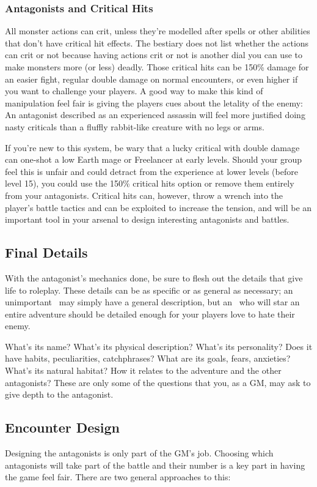 \begin{multicols}{2}
\subsubsection{Antagonists and Critical Hits}\label{gm-enemycrit}
All monster actions can crit, unless they're modelled after spells or other abilities that don't have critical hit effects. The bestiary does not list whether the actions can crit or not because having actions crit or not is another dial you can use to make monsters more (or less) deadly. Those critical hits can be 150\% damage for an easier fight, regular double damage on normal encounters, or even higher if you want to challenge your players. A good way to make this kind of manipulation feel fair is giving the players cues about the letality of the enemy: An antagonist described as an experienced assassin will feel more justified doing nasty criticals than a fluffly rabbit-like creature with no legs or arms.

If you're new to this system, be wary that a lucky critical with double damage can one-shot a low Earth mage or Freelancer at early levels. Should your group feel this is unfair and could detract from the experience at lower levels (before level 15), you could use the 150\% critical hits option or remove them entirely from your antagonists. Critical hits can, however, throw a wrench into the player's battle tactics and can be exploited to increase the tension, and will be an important tool in your arsenal to design interesting antagonists and battles.   

\subsection{Final Details}\label{gm-findet}
With the antagonist’s mechanics done, be sure to flesh out the details that give life to roleplay. These details can be as specific or as general as necessary; an unimportant \tmobmini{}\ may simply have a general description, but an \tmobleet{}\ who will star an entire adventure should be detailed enough for your players love to hate their enemy.

What's its name? What’s its physical description? What’s its personality? Does it have habits, peculiarities, catchphrases? What are its goals, fears, anxieties? What’s its natural habitat? How it relates to the adventure and the other antagonists? These are only some of the questions that you, as a GM, may ask to give depth to the antagonist.

\subsection{Encounter Design}\label{gm-encdsg}
Designing the antagonists is only part of the GM's job. Choosing which antagonists will take part of the battle and their number is a key part in having the game feel fair. There are two general approaches to this:


\end{multicols}
